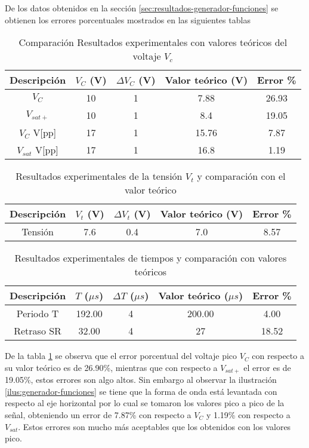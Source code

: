 De los datos obtenidos en la sección \ref{sec:resultados-generador-funciones} se obtienen los errores porcentuales mostrados en las siguientes tablas

\begin{table}[ht]
\centering
\begin{tabular}{|c|c|c|c|c|}
\hline
Descripción & $V_C$ (V) & $\Delta V_C$ (V) & Valor teórico (V) & Error \% \\ \hline
$V_C$ & 10 & 1 & 7.88 & 26.93 \\ \hline
$V_{sat+}$ & 10 & 1 & 8.4 & 19.05 \\ \hline
$V_C$ V[pp] & 17 & 1 & 15.76 & 7.87 \\ \hline
$V_{sat}$ V[pp] & 17 & 1 & 16.8 & 1.19 \\ \hline
\end{tabular}
\caption{Comparación Resultados experimentales con valores teóricos del voltaje $V_c$ }
\label{tab:comparacion-voltaje-Vc}
\end{table}

\begin{table}[ht]
\centering
\begin{tabular}{|c|c|c|c|c|}
\hline
Descripción & $V_t$ (V) & $\Delta V_t$ (V) & Valor teórico (V) & Error \% \\ \hline
Tensión & 7.6 & 0.4 & 7.0 & 8.57 \\ \hline
\end{tabular}
\caption{Resultados experimentales de la tensión $V_t$ y comparación con el valor teórico}
\label{tab:comparacion-voltaje-Vt}
\end{table}

\begin{table}[ht]
\centering
\begin{tabular}{|c|c|c|c|c|}
\hline
Descripción & $T$ ($\mu s$) & $\Delta T$ ($\mu s$) & Valor teórico ($\mu s$) & Error \% \\ \hline
Periodo T & 192.00 & 4 & 200.00 & 4.00 \\ \hline
Retraso SR & 32.00 & 4 & 27 & 18.52 \\ \hline
\end{tabular}
\caption{Resultados experimentales de tiempos y comparación con valores teóricos}
\label{tab:comparacion-tiempo-generador}
\end{table}

De la tabla \ref{tab:comparacion-voltaje-Vc} se observa que el error porcentual del voltaje pico $V_C$ con respecto a su valor teórico es de 26.90\%, mientras que con respecto a $V_{sat+}$ el error es de 19.05\%, estos errores son algo altos. Sin embargo al observar la ilustración \ref{ilus:generador-funciones} se tiene que la forma de onda está levantada con respecto al eje horizontal por lo cual se tomaron los valores pico a pico de la señal, obteniendo un error de 7.87\% con respecto a $V_C$ y 1.19\% con respecto a $V_{sat}$. Estos errores son mucho más aceptables que los obtenidos con los valores pico.

